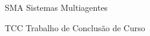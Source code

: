 \begin{siglas}
  \item[SMA] Sistemas Multiagentes
  \item[TCC] Trabalho de Conclusão de Curso
\end{siglas}
